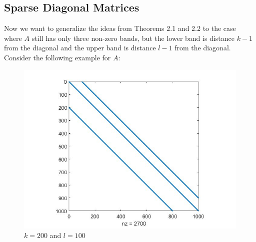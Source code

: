 \documentclass{article}
\numberwithin{pic}{section}
\numberwithin{lem}{section}
\numberwithin{thm}{section}
\numberwithin{cor}{section}
\theoremstyle{definition}
\numberwithin{ex}{section}
\numberwithin{defn}{section}
\theoremstyle{definition}
\theoremstyle{remark}
\newlength\tindent
\renewcommand{\indent}{\hspace*{\tindent}}
\begin{document}
\subsection{Sparse Diagonal Matrices}
\indent Now we want to generalize the ideas from Theorems 2.1 and 2.2 to the case where $A$ still has only three non-zero bands, but the lower band is distance $k-1$ from the diagonal and the upper band is distance $l-1$ from the diagonal.
Consider the following example for $A$: 
\begin{figure}[H]
\centering
\includegraphics[scale=0.3]{example1.jpg}
\caption{$k=200$ and $l=100$}
\end{figure}
\end{document}
